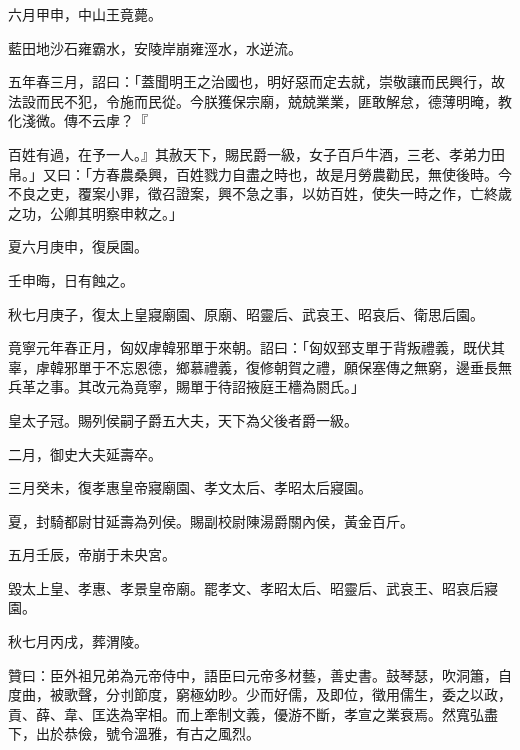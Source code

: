 \begin{pinyinscope}
六月甲申，中山王竟薨。

藍田地沙石雍霸水，安陵岸崩雍涇水，水逆流。

五年春三月，詔曰：「蓋聞明王之治國也，明好惡而定去就，崇敬讓而民興行，故法設而民不犯，令施而民從。今朕獲保宗廟，兢兢業業，匪敢解怠，德薄明晻，教化淺微。傳不云虖？『

百姓有過，在予一人。』其赦天下，賜民爵一級，女子百戶牛酒，三老、孝弟力田帛。」又曰：「方春農桑興，百姓戮力自盡之時也，故是月勞農勸民，無使後時。今不良之吏，覆案小罪，徵召證案，興不急之事，以妨百姓，使失一時之作，亡終歲之功，公卿其明察申敕之。」

夏六月庚申，復戾園。

壬申晦，日有蝕之。

秋七月庚子，復太上皇寢廟園、原廟、昭靈后、武哀王、昭哀后、衛思后園。

竟寧元年春正月，匈奴虖韓邪單于來朝。詔曰：「匈奴郅支單于背叛禮義，既伏其辜，虖韓邪單于不忘恩德，鄉慕禮義，復修朝賀之禮，願保塞傳之無窮，邊垂長無兵革之事。其改元為竟寧，賜單于待詔掖庭王檣為閼氏。」

皇太子冠。賜列侯嗣子爵五大夫，天下為父後者爵一級。

二月，御史大夫延壽卒。

三月癸未，復孝惠皇帝寢廟園、孝文太后、孝昭太后寢園。

夏，封騎都尉甘延壽為列侯。賜副校尉陳湯爵關內侯，黃金百斤。

五月壬辰，帝崩于未央宮。

毀太上皇、孝惠、孝景皇帝廟。罷孝文、孝昭太后、昭靈后、武哀王、昭哀后寢園。

秋七月丙戌，葬渭陵。

贊曰：臣外祖兄弟為元帝侍中，語臣曰元帝多材藝，善史書。鼓琴瑟，吹洞簫，自度曲，被歌聲，分刌節度，窮極幼眇。少而好儒，及即位，徵用儒生，委之以政，貢、薛、韋、匡迭為宰相。而上牽制文義，優游不斷，孝宣之業衰焉。然寬弘盡下，出於恭儉，號令溫雅，有古之風烈。


\end{pinyinscope}